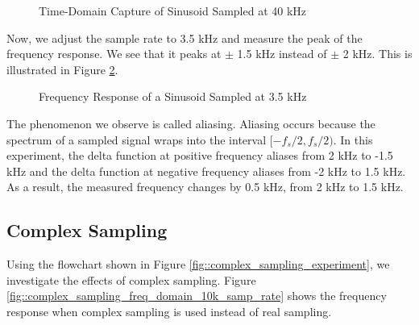 \documentclass{article}
\begin{document}
\begin{figure}[H]
	\centerline{}
	\caption{Time-Domain Capture of Sinusoid Sampled at 40 kHz}
	\label{fig::sampling_rates_time_domain_40k_samp_rate}
\end{figure}

Now, we adjust the sample rate to 3.5 kHz and measure the peak of the frequency response. We see that it peaks at $\pm$ 1.5 kHz instead of $\pm$ 2 kHz. This is illustrated in Figure \ref{fig::sampling_rates_freq_domain_3_5k_samp_rate}.

\begin{figure}[H]
	\centerline{}
	\caption{Frequency Response of a Sinusoid Sampled at 3.5 kHz}
	\label{fig::sampling_rates_freq_domain_3_5k_samp_rate}
\end{figure}

The phenomenon we observe is called aliasing. Aliasing occurs because the spectrum of a sampled signal wraps into the interval $[-f_s/2, f_s/2)$. In this experiment, the delta function at positive frequency aliases from 2 kHz to -1.5 kHz and the delta function at negative frequency aliases from -2 kHz to 1.5 kHz. As a result, the measured frequency changes by 0.5 kHz, from 2 kHz to 1.5 kHz.

\subsection{Complex Sampling}

Using the flowchart shown in Figure \ref{fig::complex_sampling_experiment}, we investigate the effects of complex sampling. Figure \ref{fig::complex_sampling_freq_domain_10k_samp_rate} shows the frequency response when complex sampling is used instead of real sampling.
\end{document}
